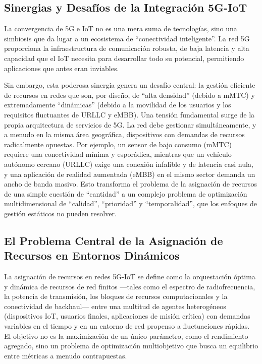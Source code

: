 \documentclass[12pt,a4paper]{article}
\begin{document}
\subsection{Sinergias y Desafíos de la Integración 5G-IoT}

La convergencia de 5G e IoT no es una mera suma de tecnologías, sino una simbiosis que da lugar a un ecosistema de ``conectividad inteligente''\cite{ref7}. La red 5G proporciona la infraestructura de comunicación robusta, de baja latencia y alta capacidad que el IoT necesita para desarrollar todo su potencial, permitiendo aplicaciones que antes eran inviables\cite{ref11}.

Sin embargo, esta poderosa sinergia genera un desafío central: la gestión eficiente de recursos en redes que son, por diseño, de ``alta densidad'' (debido a mMTC) y extremadamente ``dinámicas'' (debido a la movilidad de los usuarios y los requisitos fluctuantes de URLLC y eMBB). Una tensión fundamental surge de la propia arquitectura de servicios de 5G. La red debe gestionar simultáneamente, y a menudo en la misma área geográfica, dispositivos con demandas de recursos radicalmente opuestas. Por ejemplo, un sensor de bajo consumo (mMTC) requiere una conectividad mínima y esporádica, mientras que un vehículo autónomo cercano (URLLC) exige una conexión infalible y de latencia casi nula, y una aplicación de realidad aumentada (eMBB) en el mismo sector demanda un ancho de banda masivo. Esto transforma el problema de la asignación de recursos de una simple cuestión de ``cantidad'' a un complejo problema de optimización multidimensional de ``calidad'', ``prioridad'' y ``temporalidad'', que los enfoques de gestión estáticos no pueden resolver.

\subsection{El Problema Central de la Asignación de Recursos en Entornos Dinámicos}

La asignación de recursos en redes 5G-IoT se define como la orquestación óptima y dinámica de recursos de red finitos —tales como el espectro de radiofrecuencia, la potencia de transmisión, los bloques de recursos computacionales y la conectividad de backhaul— entre una multitud de agentes heterogéneos (dispositivos IoT, usuarios finales, aplicaciones de misión crítica) con demandas variables en el tiempo y en un entorno de red propenso a fluctuaciones rápidas\cite{ref9}. El objetivo no es la maximización de un único parámetro, como el rendimiento agregado, sino un problema de optimización multiobjetivo que busca un equilibrio entre métricas a menudo contrapuestas\cite{ref13}.
\end{document}

